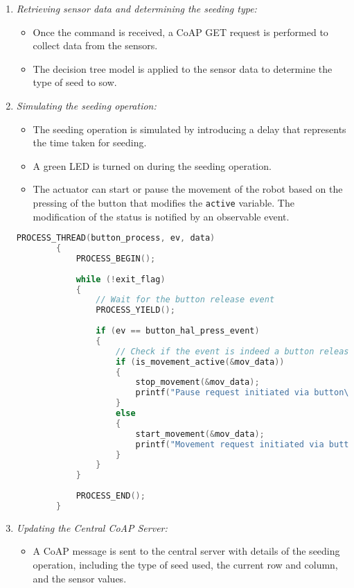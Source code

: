 \begin{enumerate}
    \item \textit{Retrieving sensor data and determining the seeding type:}
          \begin{itemize}
              \item Once the command is received, a CoAP GET request is performed to collect data from the sensors.
              \item The decision tree model is applied to the sensor data to determine the type of seed to sow.
          \end{itemize}

    \item \textit{Simulating the seeding operation:}
          \begin{itemize}
              \item The seeding operation is simulated by introducing a delay that represents the time taken for seeding.
              \item A green LED is turned on during the seeding operation.
              \item The actuator can start or pause the movement of the robot based on the pressing of the button that modifies the \texttt{active} variable.
              The modification of the status is notified by an observable event.
          \end{itemize}

          \begin{lstlisting}[language=C]
        PROCESS_THREAD(button_process, ev, data)
        {
            PROCESS_BEGIN();
        
            while (!exit_flag)
            {
                // Wait for the button release event
                PROCESS_YIELD();
        
                if (ev == button_hal_press_event)
                {
                    // Check if the event is indeed a button release event
                    if (is_movement_active(&mov_data))
                    {
                        stop_movement(&mov_data);
                        printf("Pause request initiated via button\n");
                    }
                    else
                    {
                        start_movement(&mov_data);
                        printf("Movement request initiated via button\n");
                    }
                }
            }
        
            PROCESS_END();
        }
        \end{lstlisting}


    \item \textit{Updating the Central CoAP Server:}
          \begin{itemize}
              \item A CoAP message is sent to the central server with details of the seeding operation, including the type of seed used, the current row and column, and the sensor values.
          \end{itemize}


\end{enumerate}
